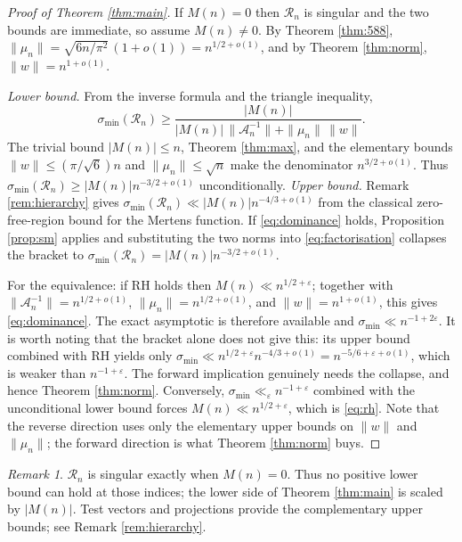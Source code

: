 \documentclass[11pt]{article}
\theoremstyle{definition}
\theoremstyle{remark}
\newtheorem{remark}[theorem]{Remark}
\newcommand{\Rc}{\mathcal{R}}
\newcommand{\Ac}{\mathcal{A}}
\begin{document}
\begin{proof}[Proof of Theorem \ref{thm:main}]
If $M(n)=0$ then $\Rc_n$ is singular and the two bounds are immediate, so assume
$M(n)\ne0$.
By Theorem \ref{thm:588}, $\|\mu_n\| = \sqrt{6n/\pi^2}\,(1+o(1)) = n^{1/2+o(1)}$,
and by Theorem \ref{thm:norm}, $\|w\|=n^{1+o(1)}$.

\emph{Lower bound.} From the inverse formula and the triangle inequality,
\[
 \sigma_{\min}(\Rc_n)
 \ge \frac{|M(n)|}{|M(n)|\,\|\Ac_n^{-1}\|+\|\mu_n\|\,\|w\|}.
\]
The trivial bound $|M(n)|\le n$, Theorem \ref{thm:max}, and the elementary bounds
$\|w\|\le(\pi/\sqrt6)n$ and $\|\mu_n\|\le\sqrt n$ make the denominator
$n^{3/2+o(1)}$. Thus
$\sigma_{\min}(\Rc_n)\ge|M(n)|n^{-3/2+o(1)}$ unconditionally.
\emph{Upper bound.} Remark \ref{rem:hierarchy} gives
$\sigma_{\min}(\Rc_n)\ll|M(n)|n^{-4/3+o(1)}$ from the classical
zero-free-region bound for the Mertens function.
If \eqref{eq:dominance} holds, Proposition \ref{prop:sm} applies and substituting
the two norms into \eqref{eq:factorisation} collapses the bracket to
$\sigma_{\min}(\Rc_n)=|M(n)|n^{-3/2+o(1)}$.

For the equivalence: if RH holds then $M(n)\ll n^{1/2+\varepsilon}$; together
with $\|\Ac_n^{-1}\|=n^{1/2+o(1)}$, $\|\mu_n\|=n^{1/2+o(1)}$, and
$\|w\|=n^{1+o(1)}$, this gives \eqref{eq:dominance}. The exact asymptotic is
therefore available and $\sigma_{\min}\ll n^{-1+2\varepsilon}$. It is worth noting that the bracket
alone does not give this: its upper bound combined with RH yields only
$\sigma_{\min}\ll n^{1/2+\varepsilon}n^{-4/3+o(1)}=n^{-5/6+\varepsilon+o(1)}$,
which is weaker than $n^{-1+\varepsilon}$. The forward implication genuinely
needs the collapse, and hence Theorem \ref{thm:norm}. Conversely,
$\sigma_{\min}\ll_\varepsilon n^{-1+\varepsilon}$ combined with the unconditional
lower bound forces $M(n)\ll n^{1/2+\varepsilon}$, which is \eqref{eq:rh}. Note
that the reverse direction uses only the elementary upper bounds on $\|w\|$ and
$\|\mu_n\|$; the forward direction is what Theorem \ref{thm:norm} buys.
\end{proof}

\begin{remark}
$\Rc_n$ is singular exactly when $M(n)=0$. Thus no positive lower bound can hold
at those indices; the lower side of Theorem \ref{thm:main} is scaled by
$|M(n)|$. Test vectors and projections provide the complementary upper bounds;
see Remark \ref{rem:hierarchy}.
\end{remark}
\end{document}
